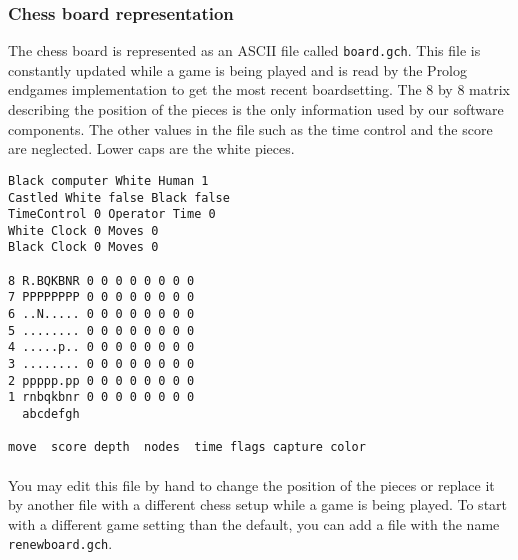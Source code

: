 \documentclass[10pt]{scrartcl}
\begin{document}
\subsubsection{Chess board representation}
\label{sec:chess-board-repr}

The chess board is represented as an ASCII file called \verb|board.gch|.
This file is constantly updated while a game is being played and is read
by the Prolog endgames implementation
to get the most recent boardsetting.  The 8 by 8 matrix describing the
position of the pieces is the only information used by our software
components. The other values in the file such as the time control and
the score are neglected. Lower caps are the white pieces. 

\begin{minipage}{\textwidth} %
\begin{verbatim}
Black computer White Human 1
Castled White false Black false
TimeControl 0 Operator Time 0
White Clock 0 Moves 0
Black Clock 0 Moves 0

8 R.BQKBNR 0 0 0 0 0 0 0 0 
7 PPPPPPPP 0 0 0 0 0 0 0 0
6 ..N..... 0 0 0 0 0 0 0 0
5 ........ 0 0 0 0 0 0 0 0
4 .....p.. 0 0 0 0 0 0 0 0
3 ........ 0 0 0 0 0 0 0 0
2 ppppp.pp 0 0 0 0 0 0 0 0
1 rnbqkbnr 0 0 0 0 0 0 0 0
  abcdefgh

move  score depth  nodes  time flags capture color
\end{verbatim}
\end{minipage}

\paragraph{}
You may edit this file by hand to change the position of the pieces or
replace it by another file with a different chess setup while a game is
being played. To start with a different game setting than the default,
you can add a file with the name \verb|renewboard.gch|. 
\begin{comment}
This file will
be loaded by playchess when a reset board command is send by hitting
``r''.
In \verb|/opt/prac/robotics/software4students/pl/boards| a few board settings are given on
which your implementation can be tested. These allow you to quickly and easily test your program
on a couple of different situations, but they are not cover every possible situation that your program
should be able to solve. So come up with some configurations yourself and try to find one where your
implementation performs poorly (e.g. it gets stuck in a loop or takes a lot more moves to reach
check mate than necessary).
\end{comment}
\end{document}
